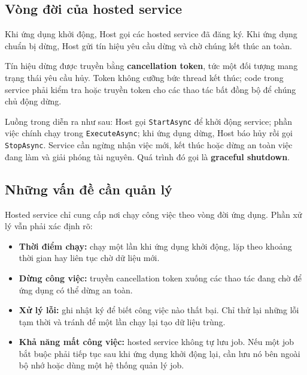 \subsection{Vòng đời của hosted service}

Khi ứng dụng khởi động, Host gọi các hosted service đã đăng ký. Khi ứng dụng chuẩn
bị dừng, Host gửi tín hiệu yêu cầu dừng và chờ chúng kết thúc an toàn.

Tín hiệu dừng được truyền bằng \textbf{cancellation token}, tức một đối tượng mang
trạng thái yêu cầu hủy. Token không cưỡng bức thread kết thúc; code trong service
phải kiểm tra hoặc truyền token cho các thao tác bất đồng bộ để chúng chủ động dừng.

\begin{center}
\resizebox{0.84\textwidth}{!}{}
\label{fig:background-lifecycle}
\end{center}

Luồng trong  diễn ra như sau: Host gọi
\texttt{StartAsync} để khởi động service; phần việc chính chạy trong
\texttt{ExecuteAsync}; khi ứng dụng dừng, Host báo hủy rồi gọi
\texttt{StopAsync}. Service cần ngừng nhận việc mới, kết thúc hoặc dừng an toàn việc
đang làm và giải phóng tài nguyên. Quá trình đó gọi là \textbf{graceful shutdown}.

\subsection{Những vấn đề cần quản lý}

Hosted service chỉ cung cấp nơi chạy công việc theo vòng đời ứng dụng. Phần xử lý
vẫn phải xác định rõ:

\begin{itemize}
  \item \textbf{Thời điểm chạy:} chạy một lần khi ứng dụng khởi động, lặp theo
  khoảng thời gian hay liên tục chờ dữ liệu mới.

  \item \textbf{Dừng công việc:} truyền cancellation token xuống các thao tác đang
  chờ để ứng dụng có thể dừng an toàn.

  \item \textbf{Xử lý lỗi:} ghi nhật ký để biết công việc nào thất bại. Chỉ thử lại
  những lỗi tạm thời và tránh để một lần chạy lại tạo dữ liệu trùng.

  \item \textbf{Khả năng mất công việc:} hosted service không tự lưu job. Nếu một
  job bắt buộc phải tiếp tục sau khi ứng dụng khởi động lại, cần lưu nó bên ngoài
  bộ nhớ hoặc dùng một hệ thống quản lý job.
\end{itemize}

